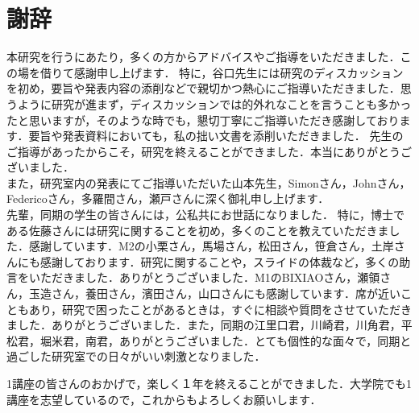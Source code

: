 \documentclass[10.5pt,a4j]{jarticle}
\begin{document}
\section{謝辞}
本研究を行うにあたり，多くの方からアドバイスやご指導をいただきました．この場を借りて感謝申し上げます．
特に，谷口先生には研究のディスカッションを初め，要旨や発表内容の添削などで親切かつ熱心にご指導いただきました．思うように研究が進まず，ディスカッションでは的外れなことを言うことも多かったと思いますが，そのような時でも，懇切丁寧にご指導いただき感謝しております．要旨や発表資料においても，私の拙い文書を添削いただきました．
先生のご指導があったからこそ，研究を終えることができました．本当にありがとうございました．\\
また，研究室内の発表にてご指導いただいた山本先生，Simonさん，Johnさん，Federicoさん，多羅間さん，瀬戸さんに深く御礼申し上げます．\\
先輩，同期の学生の皆さんには，公私共にお世話になりました．
特に，博士である佐藤さんには研究に関することを初め，多くのことを教えていただきました．感謝しています．M2の小栗さん，馬場さん，松田さん，笹倉さん，土岸さんにも感謝しております．研究に関することや，スライドの体裁など，多くの助言をいただきました．ありがとうございました．M1のBIXIAOさん，瀬領さん，玉造さん，養田さん，濱田さん，山口さんにも感謝しています．席が近いこともあり，研究で困ったことがあるときは，すぐに相談や質問をさせていただきました．ありがとうございました．また，同期の江里口君，川崎君，川角君，平松君，堀米君，南君，ありがとうございました．とても個性的な面々で，同期と過ごした研究室での日々がいい刺激となりました．

1講座の皆さんのおかげで，楽しく１年を終えることができました．大学院でも1講座を志望しているので，これからもよろしくお願いします．
\end{document}
